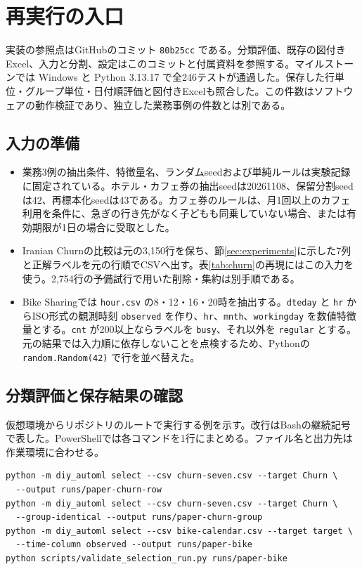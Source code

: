 \section{再実行の入口}\label{sec:repro}

実装の参照点はGitHubのコミット \texttt{80b25cc} である。分類評価、既存の図付きExcel、入力と分割、設定はこのコミットと付属資料を参照する。マイルストーンでは Windows と Python 3.13.17 で全246テストが通過した。保存した行単位・グループ単位・日付順評価と図付きExcelも照合した\cite{milestone}。この件数はソフトウェアの動作検証であり、独立した業務事例の件数とは別である。

\subsection{入力の準備}

\begin{itemize}
  \item 業務3例の抽出条件、特徴量名、ランダムseedおよび単純ルールは実験記録に固定されている。ホテル・カフェ券の抽出seedは20261108、保留分割seedは42、再標本化seedは43である。カフェ券のルールは、月1回以上のカフェ利用を条件に、急ぎの行き先がなく子どもも同乗していない場合、または有効期限が1日の場合に受取とした\cite{business}。
  \item Iranian Churnの比較は元の3,150行を保ち、節\ref{sec:experiments}に示した7列と正解ラベルを元の行順でCSVへ出す。表\ref{tab:churn}の再現にはこの入力を使う。2,754行の予備試行で用いた削除・集約は別手順である\cite{audit,churnpilot}。
  \item Bike Sharingでは \texttt{hour.csv} の8・12・16・20時を抽出する。\texttt{dteday} と \texttt{hr} からISO形式の観測時刻 \texttt{observed} を作り、\texttt{hr}、\texttt{mnth}、\texttt{workingday} を数値特徴量とする。\texttt{cnt} が200以上ならラベルを \texttt{busy}、それ以外を \texttt{regular} とする。元の結果では入力順に依存しないことを点検するため、Pythonの \texttt{random.Random(42)} で行を並べ替えた\cite{audit}。
\end{itemize}

\subsection{分類評価と保存結果の確認}

仮想環境からリポジトリのルートで実行する例を示す。改行はBashの継続記号で表した。PowerShellでは各コマンドを1行にまとめる。ファイル名と出力先は作業環境に合わせる。

{\small
\begin{verbatim}
python -m diy_automl select --csv churn-seven.csv --target Churn \
  --output runs/paper-churn-row
python -m diy_automl select --csv churn-seven.csv --target Churn \
  --group-identical --output runs/paper-churn-group
python -m diy_automl select --csv bike-calendar.csv --target target \
  --time-column observed --output runs/paper-bike
python scripts/validate_selection_run.py runs/paper-bike
\end{verbatim}
}

